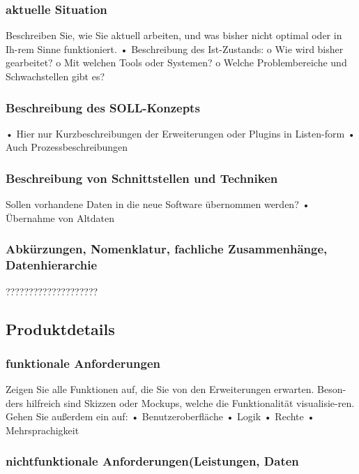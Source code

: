\subsubsection{aktuelle Situation}

Beschreiben Sie, wie Sie aktuell arbeiten, und was bisher nicht optimal oder in Ih-rem Sinne funktioniert. 
•	Beschreibung des Ist-Zustands: 
o	Wie wird bisher gearbeitet?
o	Mit welchen Tools oder Systemen?
o	Welche Problembereiche und Schwachstellen gibt es?

\subsubsection{Beschreibung des SOLL-Konzepts}

•	Hier nur Kurzbeschreibungen der Erweiterungen oder Plugins in Listen-form
•	Auch Prozessbeschreibungen

\subsubsection{Beschreibung von Schnittstellen und Techniken}

Sollen vorhandene Daten in die neue Software übernommen werden? 
•	Übernahme von Altdaten 


\subsubsection{Abkürzungen, Nomenklatur, fachliche Zusammenhänge, Datenhierarchie}
????????????????????

\subsection{Produktdetails}

\subsubsection{funktionale Anforderungen}

Zeigen Sie alle Funktionen auf, die Sie von den Erweiterungen erwarten. Beson-ders hilfreich sind Skizzen oder Mockups, welche die Funktionalität visualisie-ren. Gehen Sie außerdem ein auf: 
•	Benutzeroberfläche
•	Logik
•	Rechte
•	Mehrsprachigkeit

\subsubsection{nichtfunktionale Anforderungen(Leistungen, Daten}

